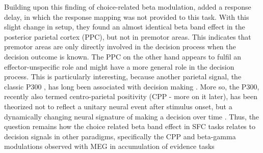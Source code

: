 Building upon this finding of choice-related beta modulation, \textcite{Ludwig2018} added a response delay, in which the response mapping was not provided to this task. With this slight change in setup, they found an almost identical beta band effect in the posterior parietal cortex (PPC), but not in premotor areas. This indicates that premotor areas are only directly involved in the decision process when the decision outcome is known. The PPC on the other hand appears to fulfil an effector-unspecific role and might have a more general role in the decision process. This is particularly interesting, because another parietal signal, the classic P300 \parencite{Chapman1964,Sutton1965}, has long been associated with decision making \parencite{Donchin1967,Rohrbaugh1974}. More so, the P300, recently also termed centro-parietal positivity (CPP - more on it later), has been theorized not to reflect a unitary neural event after stimulus onset, but a dynamically changing neural signature of making a decision over time \parencite{Twomey2015}.  Thus, the question remains how the choice related beta band effect in SFC tasks relates to decision signals in other paradigms, specifically the CPP and beta-gamma modulations observed with MEG in accumulation of evidence tasks \parencite{Donner2009,Donner2007,Kelly2013,Kelly2015,OConnell2012,Twomey2016,Twomey2015,Philiastides2014}
